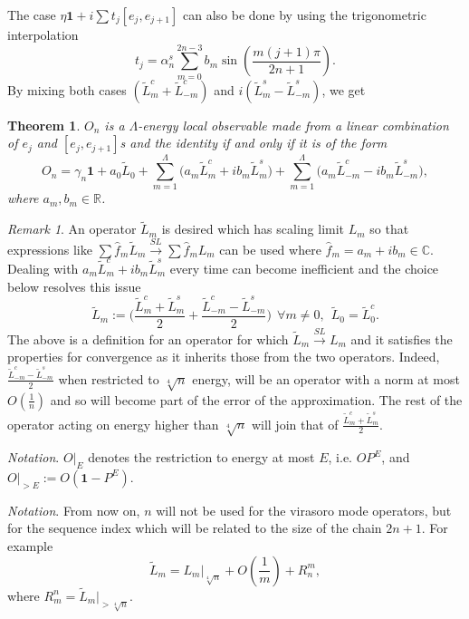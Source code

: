 \documentclass[twoside,11pt,titlepage]{amsart}
\renewcommand{\=}[1]{\stackrel{#1}{=}} %
\newtheorem{thm}{Theorem}[section]
\theoremstyle{definition}
\theoremstyle{remark}
\newtheorem{rmk}{Remark}
\begin{document}
The case $\eta\textbf{1}+i\sum t_j[e_j,e_{j+1}]$ can also be done by using the trigonometric interpolation
$$t_j=\alpha_n^s \sum_{m=0}^{2n-3} b_m\sin(\frac{m(j+1)\pi}{2n+1}).$$
By mixing both cases $(\widetilde{L}_m^c+\widetilde{L}_{-m}^c)$ and $i(\widetilde{L}_{m}^s-\widetilde{L}_{-m}^s)$, we get
\begin{thm}\label{thm4.1}
$O_n$ is a $\Lambda$-energy local observable made from a linear combination of $e_j$ and $[e_j,e_{j+1}]$s and the identity if and only if it is of the form
$$O_n=\gamma_n \textbf{1}+ a_0\widetilde{L}_0+\sum_{m=1}^{\Lambda} \Big(a_m\widetilde{L}_m^c+ib_m\widetilde{L}_m^s\Big)+\sum_{m=1}^{\Lambda}\Big(a_m\widetilde{L}_{-m}^c-ib_m\widetilde{L}_{-m}^s\Big),$$
where $a_m,b_m \in \mathbb{R}$.
\end{thm}
\begin{rmk}\label{rmk4}
An operator $\widetilde{L}_m$ is desired which has scaling limit $L_m$ so that expressions like $\sum \hat{f}_m\widetilde{L}_m  \xrightarrow{SL} \sum \hat{f}_mL_m$ can be used where $\hat{f}_m=a_m+ib_m \in \mathbb{C}$. Dealing with $a_m\widetilde{L}_m^c+ib_m\widetilde{L}_{m}^s$ every time can become inefficient and the choice below resolves this issue
$$\widetilde{L}_m:=\Big(\frac{\widetilde{L}_m^c+\widetilde{L}_m^s}{2}+\frac{\widetilde{L}_{-m}^c-\widetilde{L}_{-m}^s}{2}\Big) \ \ \forall m \neq 0, \ \ \widetilde{L}_0=\widetilde{L}_0^c.$$
The above is a definition for an operator for which $\widetilde{L}_m \xrightarrow{SL} L_m$ and it satisfies the properties for convergence as it inherits those from the two operators. Indeed, $\frac{\widetilde{L}_{-m}^c-\widetilde{L}_{-m}^s}{2}$ when restricted to $\sqrt[4]{n}$ energy, will be an operator with a norm at most $O(\frac{1}{n})$ and so will become part of the error of the approximation. The rest of the operator acting on energy higher than $\sqrt[4]{n}$ will join that of $\frac{\widetilde{L}_m^c+\widetilde{L}_m^s}{2}$.  
\end{rmk}
\textit{Notation}. $O|_E$ denotes the restriction to energy at most $E$, i.e. $OP^E$, and $O|_{>E}:=O(\textbf{1}-P^E)$.

\textit{Notation}. From now on, $n$ will not be used for the virasoro mode operators, but for the sequence index which will be related to the size of the chain $2n+1$. For example
$$\widetilde{L}_m=L_m|_{\sqrt[4]{n}}+O(\frac{1}{m})+R_n^m,$$
where $R_m^n=\widetilde{L}_m|_{>\sqrt[4]{n}}$.
\end{document}
